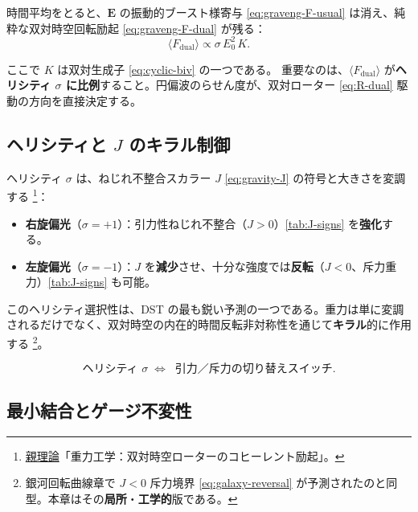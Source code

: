 \documentclass[dvipdfmx,a4paper,oneside]{jsbook}
\numberwithin{equation}{chapter}
\begin{document}
時間平均をとると、\(\mathbf{E}\) の振動的ブースト様寄与 \eqref{eq:graveng-F-usual} は消え、純粋な双対時空回転励起 \eqref{eq:graveng-F-dual} が残る：
\begin{equation}
  \langle F_{\mathrm{dual}}\rangle \propto \sigma\, E_0^2\, K.
  \label{eq:graveng-F-dual-avg}
\end{equation}

ここで \(K\) は双対生成子 \eqref{eq:cyclic-biv} の一つである。
重要なのは、\(\langle F_{\mathrm{dual}}\rangle\) が\textbf{ヘリシティ \(\sigma\) に比例}すること。円偏波のらせん度が、双対ローター \eqref{eq:R-dual} 駆動の方向を直接決定する。

\subsection{ヘリシティと \(J\) のキラル制御}

ヘリシティ \(\sigma\) は、ねじれ不整合スカラー \(J\) \eqref{eq:gravity-J} の符号と大きさを変調する \footnote{\hyperref[sec:sister-manuscripts]{親理論}「重力工学：双対時空ローターのコヒーレント励起」。}：
\begin{itemize}[leftmargin=2em]
  \item \textbf{右旋偏光}（\(\sigma = +1\)）：引力性ねじれ不整合（\(J > 0\)）\eqref{tab:J-signs} を\textbf{強化}する。
  \item \textbf{左旋偏光}（\(\sigma = -1\)）：\(J\) を\textbf{減少}させ、十分な強度では\textbf{反転}（\(J < 0\)、斥力重力）\eqref{tab:J-signs} も可能。
\end{itemize}

このヘリシティ選択性は、DST の最も鋭い予測の一つである。重力は単に変調されるだけでなく、双対時空の内在的時間反転非対称性を通じて\textbf{キラル}的に作用する \footnote{銀河回転曲線章で \(J < 0\) 斥力境界 \eqref{eq:galaxy-reversal} が予測されたのと同型。本章はその\textbf{局所}・\textbf{工学的}版である。}。

\begin{equation}
  \boxed{\;
  \text{ヘリシティ } \sigma \;\Longleftrightarrow\;\;
  \text{引力／斥力の切り替えスイッチ}.
  \;}
  \label{eq:graveng-helicity-switch}
\end{equation}

\subsection{最小結合とゲージ不変性}
\end{document}

